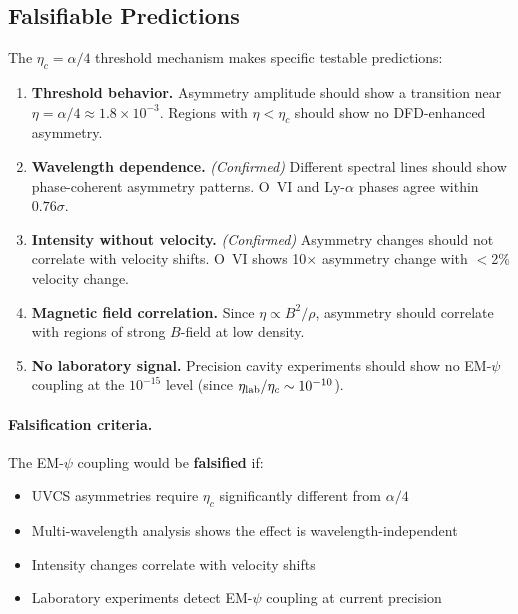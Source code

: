 \subsection{Falsifiable Predictions}\label{sec:uvcs-predictions}

The $\eta_c = \alpha/4$ threshold mechanism makes specific testable predictions:

\begin{enumerate}[nosep]
\item \textbf{Threshold behavior.} Asymmetry amplitude should show a transition 
near $\eta = \alpha/4 \approx 1.8\times10^{-3}$. Regions with $\eta < \eta_c$ 
should show no DFD-enhanced asymmetry.

\item \textbf{Wavelength dependence.} \emph{(Confirmed)} Different spectral lines 
should show phase-coherent asymmetry patterns. O~VI and Ly-$\alpha$ phases agree 
within $0.76\sigma$.

\item \textbf{Intensity without velocity.} \emph{(Confirmed)} Asymmetry changes 
should not correlate with velocity shifts. O~VI shows 10$\times$ asymmetry change 
with $<$2\% velocity change.

\item \textbf{Magnetic field correlation.} Since $\eta \propto B^2/\rho$, asymmetry 
should correlate with regions of strong $B$-field at low density.

\item \textbf{No laboratory signal.} Precision cavity experiments should show no 
EM-$\psi$ coupling at the $10^{-15}$ level (since $\eta_{\rm lab}/\eta_c \sim 10^{-10}$).
\end{enumerate}

\paragraph{Falsification criteria.}
The EM-$\psi$ coupling would be \textbf{falsified} if:
\begin{itemize}[nosep]
\item UVCS asymmetries require $\eta_c$ significantly different from $\alpha/4$
\item Multi-wavelength analysis shows the effect is wavelength-independent
\item Intensity changes correlate with velocity shifts
\item Laboratory experiments detect EM-$\psi$ coupling at current precision
\end{itemize}

